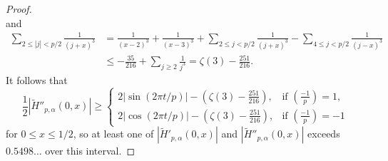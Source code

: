 \documentclass[reqno]{amsart}
\numberwithin{equation}{section}
\numberwithin{table}{section}
\numberwithin{figure}{section}
\newcommand\thinsp{5pt}
\newcommand{\leg}[2]{\left(\frac{#1}{#2}\right)}
\newcommand{\abs}[1]{\left\lvert#1\right\rvert}
\begin{document}
\begin{proof}
\[\]
and
\begin{align*}
\sum_{2\leq \abs{j}<p/2} \frac{1}{(j+x)^3}
&=
\frac{1}{(x-2)^3} + \frac{1}{(x-3)^3} + \sum_{2\leq j<p/2} \frac{1}{(j+x)^3} - \sum_{4\leq j<p/2} \frac{1}{(j-x)^3}\\
&\leq
-\frac{35}{216} + \sum_{j\geq2} \frac{1}{j^3}
=
\zeta(3) - \frac{251}{216}.
\end{align*}
It follows that
\[
\frac{1}{2}\abs{\widetilde{H}''_{p,\alpha}(0,x)}
\geq
\begin{cases}
2\abs{\sin(2\pi t/p)} - \left(\zeta(3) - \frac{251}{216}\right), & \textrm{if $\leg{-1}{p}=1$},\\[\thinsp]
2\abs{\cos(2\pi t/p)} - \left(\zeta(3) - \frac{251}{216}\right), & \textrm{if $\leg{-1}{p}=-1$}
\end{cases}
\]
for $0\leq x\leq1/2$,
so at least one of $|\widetilde{H}'_{p,\alpha}(0,x)|$ and $|\widetilde{H}''_{p,\alpha}(0,x)|$ exceeds $0.5498\ldots$ over this interval.


\end{proof}
\end{document}
